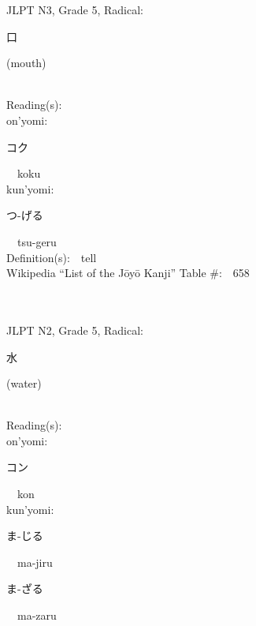 \begin{multicols}{2}
{JLPT N3, Grade 5, Radical:\ \ {\begin{CJK}{UTF8}{min} 口 \end{CJK}} (mouth) } \\
Reading(s):\ \ \\
{\hspace*{1em}}on'yomi:\ \ \\
{\hspace*{2em}}{\begin{CJK}{UTF8}{min} コク \end{CJK}}\ \ koku\ \ \\
{\hspace*{1em}}kun'yomi:\ \ \\
{\hspace*{2em}}{\begin{CJK}{UTF8}{min} つ-げる \end{CJK}}\ \ tsu-geru\ \ \\
Definition(s):\ \ tell \\
Wikipedia ``List of the J\=oy\=o Kanji'' Table \#:\ \ 658 \\
\ \ \\
{\fontsize{34pt}{40pt}  }\ \ \\  %
{JLPT N2, Grade 5, Radical:\ \ {\begin{CJK}{UTF8}{min} 水 \end{CJK}} (water) } \\
Reading(s):\ \ \\
{\hspace*{1em}}on'yomi:\ \ \\
{\hspace*{2em}}{\begin{CJK}{UTF8}{min} コン \end{CJK}}\ \ kon\ \ \\
{\hspace*{1em}}kun'yomi:\ \ \\
{\hspace*{2em}}{\begin{CJK}{UTF8}{min} ま-じる \end{CJK}}\ \ ma-jiru\ \ \\
{\hspace*{2em}}{\begin{CJK}{UTF8}{min} ま-ざる \end{CJK}}\ \ ma-zaru\ \ \\

\end{multicols}
